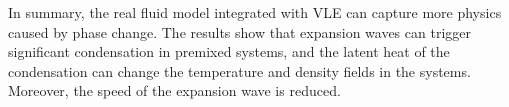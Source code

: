 In summary, the real fluid model integrated with VLE can capture more physics caused by phase change. %
The results show that expansion waves can trigger significant condensation in premixed  systems, and the latent heat of the condensation can change the temperature and density fields in the systems. Moreover, the speed of the expansion wave is reduced.




